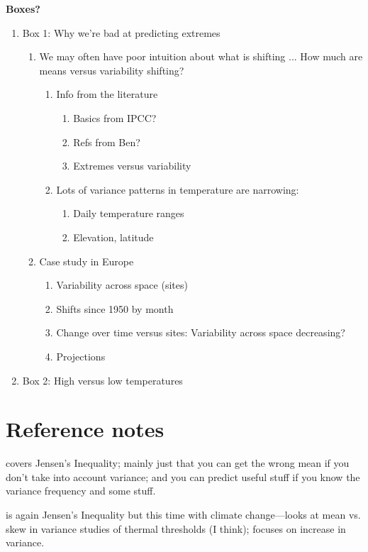 \documentclass[11pt,letter]{article}
\begin{document}
{\bf Boxes?}
\begin{enumerate}
\item Box 1: Why we're bad at predicting extremes
\begin{enumerate}
\item We may often have poor intuition about what is shifting ... How much are means versus variability shifting? %
\begin{enumerate}
\item Info from the literature
\begin{enumerate}
\item Basics from IPCC?
\item Refs from Ben?
\item Extremes versus variability
\end{enumerate}
\item Lots of variance patterns in temperature are narrowing: 
\begin{enumerate}
\item Daily temperature ranges
\item Elevation, latitude
\end{enumerate}
\end{enumerate}
\item Case study in Europe
\begin{enumerate}
\item Variability across space (sites)
\item Shifts since 1950 by month 
\item Change over time versus sites: Variability across space decreasing?
\item Projections
\end{enumerate}
\end{enumerate}
\item Box 2: High versus low temperatures
\end{enumerate}

\section{Reference notes}
\citet{Ruel:1999mp} covers Jensen's Inequality; mainly just that you can get the wrong mean if you don't take into account variance; and you can predict useful stuff if you know the variance frequency and some stuff.

\citet{vasseur2014} is again Jensen's Inequality but this time with climate change---looks at mean vs. skew in variance studies of thermal thresholds (I think); focuses on increase in variance. 
\end{document}
